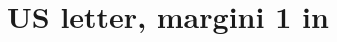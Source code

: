 \documentclass[letterpaper,11pt]{article}
\begin{document}
\section*{US letter, margini 1 in}
\lipsum[1-9]
\end{document}
